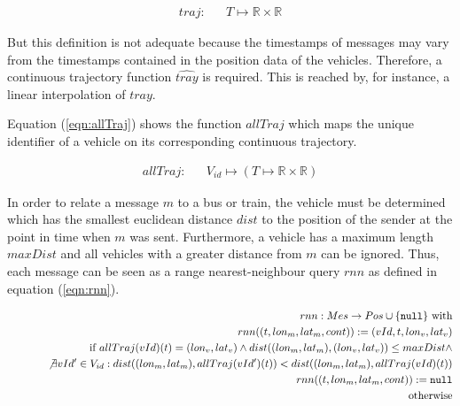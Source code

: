 \vspace*{-2\baselineskip}
\begin{eqnarray}
 traj: & & T \mapsto \mathbb{R} \times \mathbb{R}\label{eqn:traj}
\end{eqnarray}

But this definition is not adequate because the timestamps of messages may vary from the timestamps contained in the position data of the vehicles. Therefore, a continuous trajectory function $\widehat{tray}$ is required. This is reached by, for instance, a linear interpolation of $tray$.

Equation (\ref{eqn:allTraj}) shows the function $allTraj$ which maps the unique identifier of a vehicle on its corresponding continuous trajectory.

\vspace*{-2\baselineskip}
\begin{eqnarray}
 allTraj: & & V_{id} \mapsto (T \mapsto \mathbb{R} \times \mathbb{R})\label{eqn:allTraj}
\end{eqnarray}

In order to relate a message $m$ to a bus or train, the vehicle must be determined which has the smallest euclidean distance $dist$ to the position of the sender at the point in time when $m$ was sent. Furthermore, a vehicle has a maximum length $maxDist$ and all vehicles with a greater distance from $m$ can be ignored. Thus, each message can be seen as a range nearest-neighbour query $rnn$ as defined in equation (\ref{eqn:rnn}).

\vspace*{-2\baselineskip}
\begin{eqnarray}
 &&rnn: Mes \rightarrow Pos \cup \{\texttt{null}\} \textrm{ with}\label{eqn:rnn}\\
 &&rnn((t,lon_m,lat_m,cont)):= (vId,t,lon_v,lat_v)\nonumber\\
 &&\hspace*{1cm}\textrm{if } allTraj(vId)(t)=(lon_v,lat_v) \wedge dist((lon_m,lat_m),(lon_v,lat_v))\leq maxDist \wedge \nonumber\\
 &&\hspace*{1cm}\not\exists vId' \in V_{id}: dist((lon_m,lat_m),allTraj(vId')(t))< dist((lon_m,lat_m),allTraj(vId)(t))\nonumber\\
 &&rnn((t,lon_m,lat_m,cont)):= \texttt{null}\nonumber\\
 &&\hspace*{1cm}\textrm{otherwise}\nonumber
\end{eqnarray}


